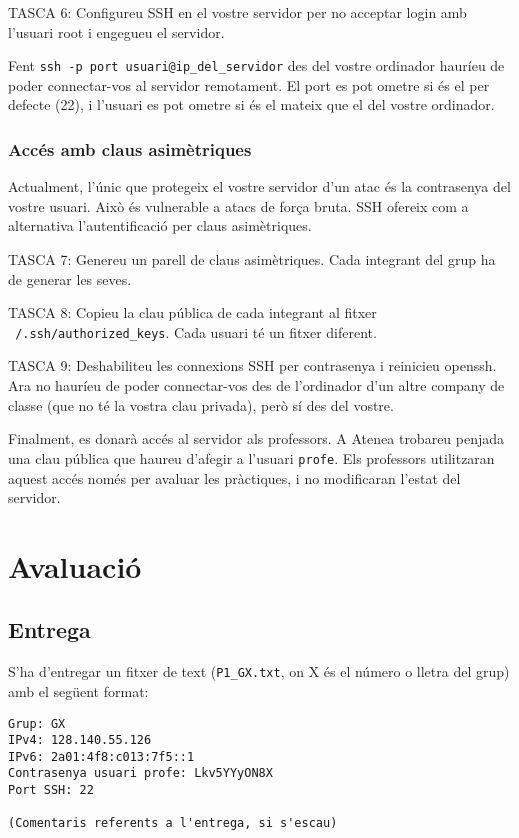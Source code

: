 \documentclass{practicaitic}
\begin{document}
TASCA 6: Configureu SSH en el vostre servidor per no acceptar login amb
l'usuari root i engegueu el servidor.

Fent \texttt{ssh -p port usuari@ip\_del\_servidor} des del vostre ordinador 
hauríeu de poder connectar-vos al servidor remotament. El port es pot ometre si
és el per defecte (22), i l'usuari es pot ometre si és el mateix que el del
vostre ordinador.

\subsubsection{Accés amb claus asimètriques}

Actualment, l'únic que protegeix el vostre servidor d'un atac és la contrasenya
del vostre usuari. Això és vulnerable a atacs de força bruta. SSH ofereix com a
alternativa l'autentificació per claus asimètriques.

TASCA 7: Genereu un parell de claus asimètriques. Cada integrant del grup ha de
generar les seves.

TASCA 8: Copieu la clau pública de cada integrant al fitxer
\texttt{~/.ssh/authorized\_keys}. Cada usuari té un fitxer diferent.

TASCA 9: Deshabiliteu les connexions SSH per contrasenya i reinicieu openssh.
Ara no hauríeu de poder connectar-vos des de l'ordinador d'un altre company
de classe (que no té la vostra clau privada), però sí des del vostre.

Finalment, es donarà accés al servidor als professors. A Atenea trobareu penjada
una clau pública que haureu d'afegir a l'usuari \texttt{profe}. Els professors
utilitzaran aquest accés només per avaluar les pràctiques, i no modificaran
l'estat del servidor.

\section{Avaluació}
\subsection{Entrega}
\label{sec:entrega}

S'ha d'entregar un fitxer de text (\texttt{P1\_GX.txt}, on X és el número o 
lletra del grup) amb el següent format:

\begin{verbatim}
Grup: GX
IPv4: 128.140.55.126
IPv6: 2a01:4f8:c013:7f5::1
Contrasenya usuari profe: Lkv5YYyON8X
Port SSH: 22

(Comentaris referents a l'entrega, si s'escau)
\end{verbatim}
\end{document}
